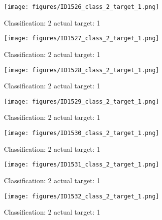 \begin{figure}[h!]
\begin{center}
\texttt{[image: figures/ID1526\_class\_2\_target\_1.png]}
\end{center}
\caption{ Classification: 2 actual target: 1}
\label{fig:ID1526_class_2_target_1}
\end{figure}
\begin{figure}[h!]
\begin{center}
\texttt{[image: figures/ID1527\_class\_2\_target\_1.png]}
\end{center}
\caption{ Classification: 2 actual target: 1}
\label{fig:ID1527_class_2_target_1}
\end{figure}
\begin{figure}[h!]
\begin{center}
\texttt{[image: figures/ID1528\_class\_2\_target\_1.png]}
\end{center}
\caption{ Classification: 2 actual target: 1}
\label{fig:ID1528_class_2_target_1}
\end{figure}
\begin{figure}[h!]
\begin{center}
\texttt{[image: figures/ID1529\_class\_2\_target\_1.png]}
\end{center}
\caption{ Classification: 2 actual target: 1}
\label{fig:ID1529_class_2_target_1}
\end{figure}
\begin{figure}[h!]
\begin{center}
\texttt{[image: figures/ID1530\_class\_2\_target\_1.png]}
\end{center}
\caption{ Classification: 2 actual target: 1}
\label{fig:ID1530_class_2_target_1}
\end{figure}
\begin{figure}[h!]
\begin{center}
\texttt{[image: figures/ID1531\_class\_2\_target\_1.png]}
\end{center}
\caption{ Classification: 2 actual target: 1}
\label{fig:ID1531_class_2_target_1}
\end{figure}
\begin{figure}[h!]
\begin{center}
\texttt{[image: figures/ID1532\_class\_2\_target\_1.png]}
\end{center}
\caption{ Classification: 2 actual target: 1}
\label{fig:ID1532_class_2_target_1}
\end{figure}
